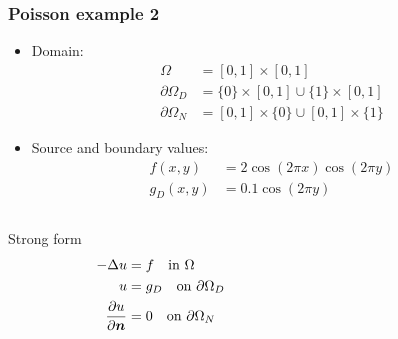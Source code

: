 \begin{frame}[shrink=20]
  \frametitle{Poisson example 2}
    \begin{itemize}
      \item Domain: \vspace{-1em}
        \begin{align*}
          \Omega &= [0,1]\times[0,1] \\
        \partial \Omega_D &= \{0\} \times [0,1] \cup \{1\} \times
        [0,1]
        \\
        \partial \Omega_N &= [0,1] \times \{0\}  \cup [0,1] \times 
        \{1\}  
        \end{align*}
      \item  Source and boundary values: 
        \vspace{-0.5em}
        \begin{align*}
          f(x,y) &= 2\cos(2\pi x)\cos(2\pi y) 
          \\
          g_D(x,y) &= 0.1 \cos(2\pi y)
        \end{align*}
    \end{itemize}
    \vspace{-1em}
    \begin{columns}[t]
      \begin{column}{0.4\textwidth}
        \begin{block}{Strong form}
          \vspace{-2em}
          \begin{align*}
            -\Delta u &= f \quad \text{in } \Omega \\
                    u &= g_D \quad \text{on } \partial \Omega_D \\
              \dfrac{\partial u}{\partial \boldsymbol{n}} &= 0 \quad \text{on }
            \partial \Omega_N
          \end{align*}
        \end{block}
      \end{column}
      \begin{column}{0.6\textwidth}
\end{column}
\end{columns}
\end{frame}
